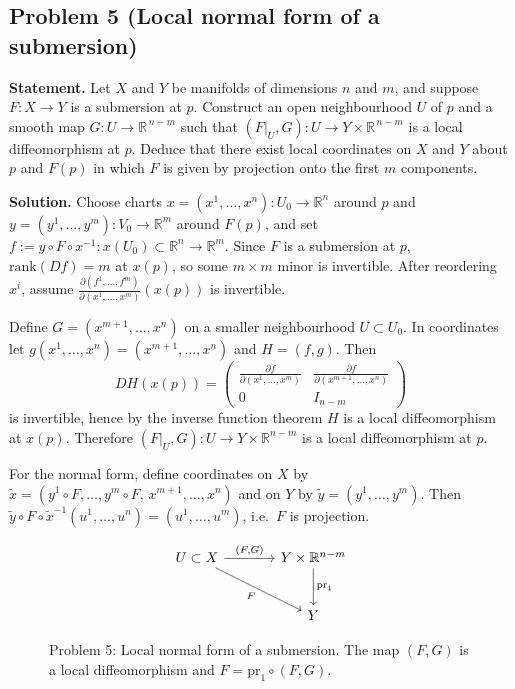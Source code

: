 \documentclass[12pt,a4paper]{article}
\theoremstyle{plain}
\theoremstyle{definition}      %
\begin{document}
	
\subsection*{Problem 5 (Local normal form of a submersion)}
\textbf{Statement.}
Let $X$ and $Y$ be manifolds of dimensions $n$ and $m$, and suppose $F:X\to Y$ is a submersion at $p$.
Construct an open neighbourhood $U$ of $p$ and a smooth map $G:U\to \mathbb{R}^{\,n-m}$ such that
$(F|_U,G):U\to Y\times \mathbb{R}^{\,n-m}$ is a local diffeomorphism at $p$.
Deduce that there exist local coordinates on $X$ and $Y$ about $p$ and $F(p)$ in which $F$ is given by
projection onto the first $m$ components.

\textbf{Solution.}
Choose charts $x=(x^1,\dots,x^n):U_0\to \mathbb{R}^n$ around $p$ and
$y=(y^1,\dots,y^m):V_0\to \mathbb{R}^m$ around $F(p)$, and set
$f:= y\circ F\circ x^{-1}:x(U_0)\subset\mathbb{R}^n\to \mathbb{R}^m$.
Since $F$ is a submersion at $p$, $\mathrm{rank}(Df)=m$ at $x(p)$, so some $m\times m$ minor is invertible.
After reordering $x^i$, assume
$\frac{\partial(f^1,\dots,f^m)}{\partial(x^1,\dots,x^m)}(x(p))$ is invertible.

Define $G=(x^{m+1},\dots,x^n)$ on a smaller neighbourhood $U\subset U_0$.
In coordinates let $g(x^1,\dots,x^n)=(x^{m+1},\dots,x^n)$ and $H=(f,g)$.
Then
\[
DH(x(p))=
\begin{pmatrix}
	\frac{\partial f}{\partial (x^1,\dots,x^m)} & \frac{\partial f}{\partial (x^{m+1},\dots,x^n)}\\
	0 & I_{n-m}
\end{pmatrix}
\]
is invertible, hence by the inverse function theorem $H$ is a local diffeomorphism at $x(p)$.
Therefore $(F|_U,G):U\to Y\times\mathbb{R}^{n-m}$ is a local diffeomorphism at $p$.

For the normal form, define coordinates on $X$ by
$\tilde x=(y^1\circ F,\dots,y^m\circ F,\,x^{m+1},\dots,x^n)$
and on $Y$ by $\tilde y=(y^1,\dots,y^m)$.
Then $\tilde y\circ F\circ \tilde x^{-1}(u^1,\dots,u^n)=(u^1,\dots,u^m)$, i.e.\ $F$ is projection.


\begin{figure}[h]
	\centering
	\[
	\begin{tikzcd}[row sep=large, column sep=large]
		U \subset X \arrow[r, "{(F,G)}"] \arrow[dr, "F"'] & Y \times \mathbb{R}^{n-m} \arrow[d, "\mathrm{pr}_1"] \\
		& Y
	\end{tikzcd}
	\]
	\caption{Problem 5: Local normal form of a submersion. The map $(F,G)$ is a local diffeomorphism and $F=\mathrm{pr}_1\circ (F,G)$.}
\end{figure}
\end{document}
